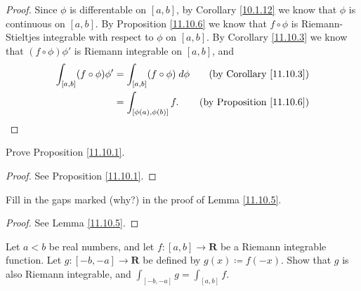 \begin{proof}
    Since \(\phi\) is differentable on \([a, b]\), by Corollary \ref{10.1.12} we know that \(\phi\) is continuous on \([a, b]\).
    By Proposition \ref{11.10.6} we know that \(f \circ \phi\) is Riemann-Stieltjes integrable with respect to \(\phi\) on \([a, b]\).
    By Corollary \ref{11.10.3} we know that \((f \circ \phi) \phi'\) is Riemann integrable on \([a, b]\), and
    \begin{align*}
        \int_{[a, b]} (f \circ \phi) \phi' & = \int_{[a, b]} (f \circ \phi) \; d \phi & \text{(by Corollary \ref{11.10.3})}   \\
                                           & = \int_{[\phi(a), \phi(b)]} f.           & \text{(by Proposition \ref{11.10.6})}
    \end{align*}
\end{proof}

\exercisesection

\begin{exercise}\label{ex 11.10.1}
    Prove Proposition \ref{11.10.1}.
\end{exercise}

\begin{proof}
    See Proposition \ref{11.10.1}.
\end{proof}

\begin{exercise}\label{ex 11.10.2}
    Fill in the gaps marked (why?) in the proof of Lemma \ref{11.10.5}.
\end{exercise}

\begin{proof}
    See Lemma \ref{11.10.5}.
\end{proof}

\begin{exercise}\label{ex 11.10.3}
    Let \(a < b\) be real numbers, and let \(f : [a, b] \to \mathbf{R}\) be a Riemann integrable function.
    Let \(g : [-b, -a] \to \mathbf{R}\) be defined by \(g(x) \coloneqq f(-x)\).
    Show that \(g\) is also Riemann integrable, and \(\int_{[-b, -a]} g = \int_{[a, b]} f\).
\end{exercise}

